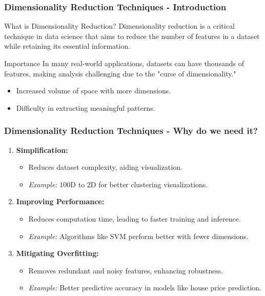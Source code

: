 \documentclass[aspectratio=169]{beamer}
\begin{document}
\begin{frame}[fragile]
    \frametitle{Dimensionality Reduction Techniques - Introduction}
    
    \begin{block}{What is Dimensionality Reduction?}
        Dimensionality reduction is a critical technique in data science that aims to reduce the number of features in a dataset while retaining its essential information. 
    \end{block}
    
    \begin{block}{Importance}
        In many real-world applications, datasets can have thousands of features, making analysis challenging due to the "curse of dimensionality." 
    \end{block}
    
    \begin{itemize}
        \item Increased volume of space with more dimensions.
        \item Difficulty in extracting meaningful patterns.
    \end{itemize}
\end{frame}

\begin{frame}[fragile]
    \frametitle{Dimensionality Reduction Techniques - Why do we need it?}

    \begin{enumerate}
        \item \textbf{Simplification:} 
            \begin{itemize}
                \item Reduces dataset complexity, aiding visualization.
                \item \textit{Example:} 100D to 2D for better clustering visualizations.
            \end{itemize}
        
        \item \textbf{Improving Performance:}
            \begin{itemize}
                \item Reduces computation time, leading to faster training and inference.
                \item \textit{Example:} Algorithms like SVM perform better with fewer dimensions.
            \end{itemize}
        
        \item \textbf{Mitigating Overfitting:} 
            \begin{itemize}
                \item Removes redundant and noisy features, enhancing robustness.
                \item \textit{Example:} Better predictive accuracy in models like house price prediction.
            \end{itemize}
    \end{enumerate}
\end{frame}
\end{document}
